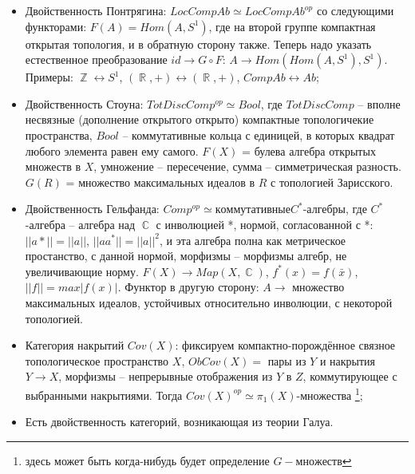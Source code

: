 \documentclass[a4paper]{article}
\theoremstyle{indented}
\theoremstyle{definition}
\theoremstyle{remark}
\DeclareMathOperator{\CC}{\mathbb{C}}
\DeclareMathOperator{\ZZ}{\mathbb{Z}}
\DeclareMathOperator{\RR}{\mathbb{R}}
\begin{document}
\begin{itemize}
\item Двойственность Понтрягина: $LocCompAb\simeq LocCompAb^{op}$ со следующими функторами: $F(A) = Hom(A, S^1)$, где на второй группе компактная открытая топология, и в обратную сторону также. Теперь надо указать естественное преобразование $id \rightarrow G\circ F$: $A \rightarrow Hom(Hom(A, S^1), S^1)$. Примеры: $\ZZ \longleftrightarrow S^1$, $(\RR, +) \longleftrightarrow (\RR, +)$, $CompAb \longleftrightarrow Ab$;
\item Двойственность Стоуна: $TotDiscComp^{op} \simeq  Bool$, где $TotDiscComp$ -- вполне несвязные (дополнение открытого открыто) компактные топологичекие пространства, $Bool$ -- коммутативные кольца с единицей, в которых квадрат любого элемента равен ему самого. $F(X)$ = булева алгебра открытых множеств в $X$, умножение -- пересечение, сумма -- симметрическая разность. $G(R)$ = множество максимальных идеалов в $R$ с топологией Зарисского.
\item Двойственность Гельфанда: $Comp^{op} \simeq коммутативные C^*$-алгебры, где $C^*$-алгебра -- алгебра над $\CC$ с инволюцией *, нормой, согласованной с *: $||a*|| = ||a||$, $||aa^*|| = ||a||^2$, и эта алгебра полна как метрическое простанство, с данной нормой, морфизмы -- морфизмы алгебр, не увеличивающие норму. $F(X) \rightarrow Map(X, \CC)$, $f^*(x) = f(\bar{x})$, $||f|| = max|f(x)|$. Функтор в другую сторону: $A \rightarrow$ множество максимальных идеалов, устойчивых относительно инволюции, с некоторой топологией.
\item Категория накрытий $Cov(X)$: фиксируем компактно-порождённое связное топологическое пространство $X$, $ObCov(X) =$ пары из $Y$ и накрытия $Y \rightarrow X$, морфизмы -- непрерывные отображения из $Y$ в $Z$, коммутирующее с выбранными накрытиями. Тогда $Cov(X)^{op} \simeq \pi_{1}(X)$-множества \footnote{здесь может быть когда-нибудь будет определение $G-множеств$};
\item Есть двойственность категорий, возникающая из теории Галуа.
\end{itemize}
\end{document}
